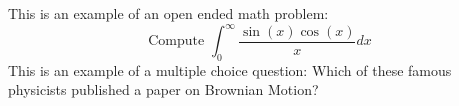 \documentclass[12pt]{exam}%
\begin{document}
%
\normalsize%
%
\begin{questions}%
\question This is an example of an open ended math problem: $$\text{Compute }\int_{0}^{\infty}\frac{\sin(x)\cos(x)}{x}dx$$%
\vspace{2in}%
\question This is an example of a multiple choice question: Which of these famous physicists published a paper on Brownian Motion?%
\begin{checkboxes}%
%
%
\end{checkboxes}%
\vspace{1in}%
\question%
%
\end{questions}%
\end{document}
